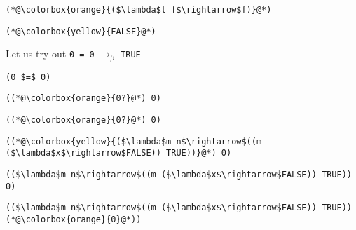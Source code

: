 \documentclass{beamer}
\begin{document}
\begin{frame}[fragile]{\CurrentSection}
\lstset{basicstyle=\ttfamily\small}\lstset{numbers=none}\lstset{language=ML}\begin{lstlisting}
(*@\colorbox{orange}{($\lambda$t f$\rightarrow$f)}@*)
\end{lstlisting}
\pause\lstset{language=ML}\begin{lstlisting}
(*@\colorbox{yellow}{FALSE}@*)
\end{lstlisting}

\end{frame}

\begin{frame}[fragile]{\CurrentSection}
\begin{block}{\CurrentSubSection}
Let us try out \texttt{0 = 0} $\rightarrow_\beta$ \texttt{TRUE}
\end{block}


\end{frame}

\begin{frame}[fragile]{\CurrentSection}
\lstset{basicstyle=\ttfamily\small}\lstset{numbers=none}\lstset{language=ML}\begin{lstlisting}
(0 $=$ 0)
\end{lstlisting}
\pause\lstset{language=ML}\begin{lstlisting}
((*@\colorbox{orange}{0?}@*) 0)
\end{lstlisting}

\end{frame}

\begin{frame}[fragile]{\CurrentSection}
\lstset{basicstyle=\ttfamily\small}\lstset{numbers=none}\lstset{language=ML}\begin{lstlisting}
((*@\colorbox{orange}{0?}@*) 0)
\end{lstlisting}
\pause\lstset{language=ML}\begin{lstlisting}
((*@\colorbox{yellow}{($\lambda$m n$\rightarrow$((m ($\lambda$x$\rightarrow$FALSE)) TRUE))}@*) 0)
\end{lstlisting}

\end{frame}

\begin{frame}[fragile]{\CurrentSection}
\lstset{basicstyle=\ttfamily\small}\lstset{numbers=none}\lstset{language=ML}\begin{lstlisting}
(($\lambda$m n$\rightarrow$((m ($\lambda$x$\rightarrow$FALSE)) TRUE)) 0)
\end{lstlisting}
\pause\lstset{language=ML}\begin{lstlisting}
(($\lambda$m n$\rightarrow$((m ($\lambda$x$\rightarrow$FALSE)) TRUE)) (*@\colorbox{orange}{0}@*))
\end{lstlisting}

\end{frame}
\end{document}
